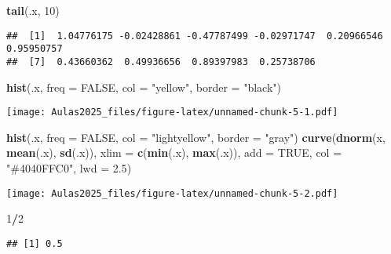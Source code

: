 \documentclass[
]{book}
\newenvironment{Shaded}{\begin{snugshade}}{\end{snugshade}}
\newcommand{\AttributeTok}[1]{\textcolor[rgb]{0.13,0.29,0.53}{#1}}
\newcommand{\ConstantTok}[1]{\textcolor[rgb]{0.56,0.35,0.01}{#1}}
\newcommand{\DecValTok}[1]{\textcolor[rgb]{0.00,0.00,0.81}{#1}}
\newcommand{\FloatTok}[1]{\textcolor[rgb]{0.00,0.00,0.81}{#1}}
\newcommand{\FunctionTok}[1]{\textcolor[rgb]{0.13,0.29,0.53}{\textbf{#1}}}
\newcommand{\NormalTok}[1]{#1}
\newcommand{\SpecialCharTok}[1]{\textcolor[rgb]{0.81,0.36,0.00}{\textbf{#1}}}
\newcommand{\StringTok}[1]{\textcolor[rgb]{0.31,0.60,0.02}{#1}}
\begin{document}
\begin{Shaded}
\begin{Highlighting}[]
\FunctionTok{tail}\NormalTok{(.x, }\DecValTok{10}\NormalTok{)}
\end{Highlighting}
\end{Shaded}

\begin{verbatim}
##  [1]  1.04776175 -0.02428861 -0.47787499 -0.02971747  0.20966546  0.95950757
##  [7]  0.43660362  0.49936656  0.89397983  0.25738706
\end{verbatim}

\begin{Shaded}
\begin{Highlighting}[]
\FunctionTok{hist}\NormalTok{(.x, }\AttributeTok{freq =} \ConstantTok{FALSE}\NormalTok{, }\AttributeTok{col =} \StringTok{"yellow"}\NormalTok{, }\AttributeTok{border =} \StringTok{"black"}\NormalTok{)}
\end{Highlighting}
\end{Shaded}

\texttt{[image: Aulas2025\_files/figure-latex/unnamed-chunk-5-1.pdf]}

\begin{Shaded}
\begin{Highlighting}[]
\FunctionTok{hist}\NormalTok{(.x, }\AttributeTok{freq =} \ConstantTok{FALSE}\NormalTok{, }\AttributeTok{col =} \StringTok{"lightyellow"}\NormalTok{, }\AttributeTok{border =} \StringTok{"gray"}\NormalTok{)}
\FunctionTok{curve}\NormalTok{(}\FunctionTok{dnorm}\NormalTok{(x, }\FunctionTok{mean}\NormalTok{(.x), }\FunctionTok{sd}\NormalTok{(.x)), }\AttributeTok{xlim =} \FunctionTok{c}\NormalTok{(}\FunctionTok{min}\NormalTok{(.x), }\FunctionTok{max}\NormalTok{(.x)),}
    \AttributeTok{add =} \ConstantTok{TRUE}\NormalTok{, }\AttributeTok{col =} \StringTok{"\#4040FFC0"}\NormalTok{, }\AttributeTok{lwd =} \FloatTok{2.5}\NormalTok{)}
\end{Highlighting}
\end{Shaded}

\texttt{[image: Aulas2025\_files/figure-latex/unnamed-chunk-5-2.pdf]}

\begin{Shaded}
\begin{Highlighting}[]
\DecValTok{1}\SpecialCharTok{/}\DecValTok{2}
\end{Highlighting}
\end{Shaded}

\begin{verbatim}
## [1] 0.5
\end{verbatim}
\end{document}

